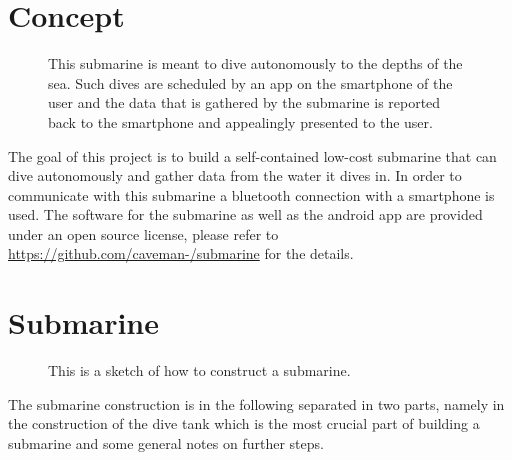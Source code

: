 \documentclass{tufte-handout}
\begin{document}
\section{Concept}
\begin{figure}
	\resizebox{\textwidth}{!}{}
	\caption{This submarine is meant to dive autonomously to the depths of the
		sea. Such dives are scheduled by an app on the smartphone of the user and
		the data that is gathered by the submarine is reported back to the
		smartphone and appealingly presented to the user.}
\end{figure}
The goal of this project is to build a self-contained low-cost submarine that
can dive autonomously and gather data from the water it dives in. In order to
communicate with this submarine a bluetooth connection with a smartphone is
used. The software for the submarine as well as the android app are provided
under an open source license, please refer to
\url{https://github.com/caveman-/submarine} for the details.
\section{Submarine}
\begin{figure}
	\resizebox{\textwidth}{!}{}
	\caption{This is a sketch of how to construct a submarine.}
\end{figure}
The submarine construction is in the following separated in two parts, namely
in the construction of the dive tank which is the most crucial part of building
a submarine and some general notes on further steps.
\end{document}
